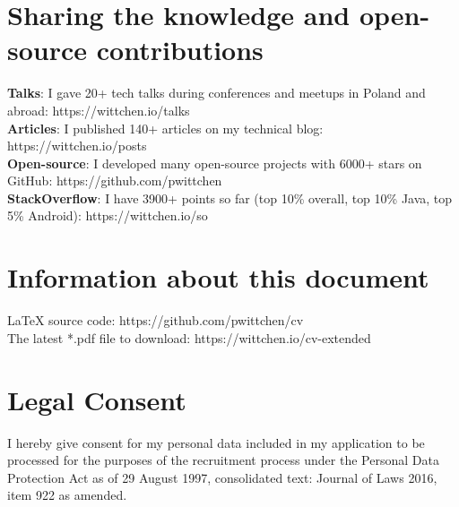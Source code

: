 \documentclass[letterpaper,11pt]{article}
\begin{document}
\section{Sharing the knowledge and open-source contributions}
 \begin{itemize}[leftmargin=0.15in, label={}]
    \small{\item{
     \textbf{Talks}{: I gave 20+ tech talks during conferences and meetups in Poland and abroad: https://wittchen.io/talks} \\
     \textbf{Articles}{: I published 140+ articles on my technical blog: https://wittchen.io/posts} \\
     \textbf{Open-source}{: I developed many open-source projects with 6000+ stars on GitHub: https://github.com/pwittchen} \\
     \textbf{StackOverflow}{: I have 3900+ points so far (top 10\% overall, top 10\% Java, top 5\% Android): https://wittchen.io/so}
    }}
 \end{itemize}

\section{Information about this document}
 \begin{itemize}[leftmargin=0.15in, label={}]
    \small{\item{
    {LaTeX source code: https://github.com/pwittchen/cv} \\
    {The latest *.pdf file to download: https://wittchen.io/cv-extended}
    }}
 \end{itemize}

\section{Legal Consent}
 \begin{itemize}[leftmargin=0.15in, label={}]
    \small{\item{
    I hereby give consent for my personal data included in my application
    to be processed for the purposes of the recruitment process
    under the Personal Data Protection Act as of 29 August 1997,
    consolidated text: Journal of Laws 2016, item 922 as amended. \\
    }}
 \end{itemize}

\end{document}
